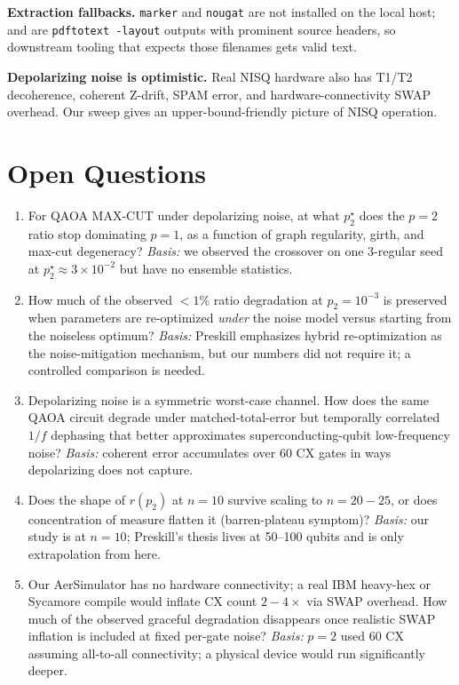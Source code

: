 \documentclass[11pt]{article}
\begin{document}
\textbf{Extraction fallbacks.} \texttt{marker} and \texttt{nougat} are not
installed on the local host;  and
 are \texttt{pdftotext -layout} outputs with
prominent source headers, so downstream tooling that expects those filenames
gets valid text.

\textbf{Depolarizing noise is optimistic.} Real NISQ hardware also has T1/T2
decoherence, coherent Z-drift, SPAM error, and hardware-connectivity SWAP
overhead. Our sweep gives an upper-bound-friendly picture of NISQ operation.

\section*{Open Questions}

\begin{enumerate}
\item[\textbf{Q1.}] For QAOA MAX-CUT under depolarizing noise, at what
$p_2^\star$ does the $p{=}2$ ratio stop dominating $p{=}1$, as a function of
graph regularity, girth, and max-cut degeneracy? \emph{Basis:} we observed
the crossover on one 3-regular seed at $p_2^\star \!\approx\! 3\!\times\!10^{-2}$
but have no ensemble statistics.

\item[\textbf{Q2.}] How much of the observed $<1\%$ ratio degradation at
$p_2 = 10^{-3}$ is preserved when parameters are re-optimized \emph{under}
the noise model versus starting from the noiseless optimum? \emph{Basis:}
Preskill emphasizes hybrid re-optimization as the noise-mitigation mechanism,
but our numbers did not require it; a controlled comparison is needed.

\item[\textbf{Q3.}] Depolarizing noise is a symmetric worst-case channel.
How does the same QAOA circuit degrade under matched-total-error but
temporally correlated $1/f$ dephasing that better approximates
superconducting-qubit low-frequency noise? \emph{Basis:} coherent error
accumulates over 60 CX gates in ways depolarizing does not capture.

\item[\textbf{Q4.}] Does the shape of $r(p_2)$ at $n{=}10$ survive scaling
to $n = 20{-}25$, or does concentration of measure flatten it (barren-plateau
symptom)? \emph{Basis:} our study is at $n{=}10$; Preskill's thesis lives
at 50--100 qubits and is only extrapolation from here.

\item[\textbf{Q5.}] Our AerSimulator has no hardware connectivity; a real
IBM heavy-hex or Sycamore compile would inflate CX count $2{-}4\times$ via
SWAP overhead. How much of the observed graceful degradation disappears once
realistic SWAP inflation is included at fixed per-gate noise? \emph{Basis:}
$p{=}2$ used 60 CX assuming all-to-all connectivity; a physical device would
run significantly deeper.
\end{enumerate}
\end{document}

